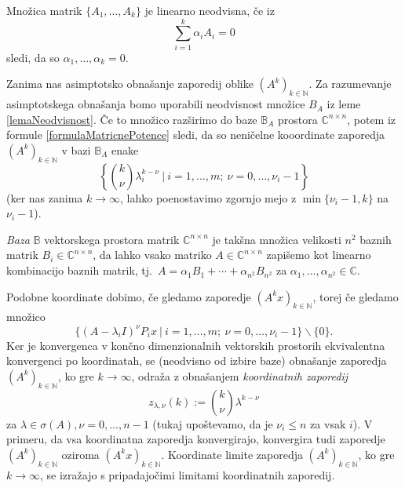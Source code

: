 \documentclass[mat1]{fmfdelo}
\newcommand{\N}{\mathbb N}
\newcommand{\C}{\mathbb C}
\begin{document}
\begin{opomba}
    Množica matrik $\{A_1, \ldots, A_k\}$ je linearno neodvisna, če iz
    \begin{equation*}
        \sum_{i=1}^k \alpha_i A_i = 0
    \end{equation*}
    sledi, da so $\alpha_1, \ldots, \alpha_k = 0$.
\end{opomba}
Zanima nas asimptotsko obnašanje zaporedij oblike $(A^k)_{k\in\N}$. Za razumevanje asimptotskega obnašanja bomo uporabili neodvisnost množice $B_A$ iz leme \ref{lemaNeodvisnost}. Če to množico razširimo do baze $\mathbb{B}_A$ prostora $\C^{n \times n}$, potem iz formule \eqref{formulaMatricnePotence} sledi, da so neničelne kooordinate zaporedja $(A^k)_{k\in\N}$ v bazi $\mathbb{B}_A$ enake
\begin{equation*}
    \left\{{k \choose \nu} \lambda_i^{k-\nu}\ |\ i = 1, \ldots, m;\ \nu = 0, \ldots, \nu_i-1\right\}
\end{equation*}
(ker nas zanima $k \rightarrow \infty$, lahko poenostavimo zgornjo mejo z $\min\{\nu_i-1, k\}$ na $\nu_i - 1$).
\begin{opomba}
    \emph{Baza} $\mathbb{B}$ vektorskega prostora matrik $\C^{n\times n}$ je takšna množica velikosti $n^2$ baznih matrik $B_i \in \C^{n\times n}$, da lahko vsako matriko $A \in \C^{n\times n}$ zapišemo kot linearno kombinacijo baznih matrik, tj.\ $A = \alpha_1 B_1 + \cdots + \alpha_{n^2} B_{n^2}$ za $\alpha_1, \ldots, \alpha_{n^2} \in \C$.
\end{opomba}
Podobne koordinate dobimo, če gledamo zaporedje $(A^k x)_{k\in\N}$, torej če gledamo množico
\begin{equation*}
    \{(A-\lambda_i I)^{\nu} P_i x\ |\ i = 1, \ldots, m;\ \nu = 0, \ldots, \nu_i - 1\} \backslash \{0\}.
\end{equation*}
Ker je konvergenca v končno dimenzionalnih vektorskih prostorih ekvivalentna konvergenci po koordinatah, se (neodvisno od izbire baze) obnašanje zaporedja $(A^k)_{k\in\N}$, ko gre $k \rightarrow \infty$, odraža z obnašanjem \emph{koordinatnih zaporedij}
\begin{equation*}
    z_{\lambda, \nu} (k) := {k \choose \nu} \lambda^{k - \nu}
\end{equation*}
za $\lambda \in \sigma(A), \nu = 0, \ldots, n-1$  (tukaj upoštevamo, da je $\nu_i \leq n$ za vsak $i$). V primeru, da vsa koordinatna zaporedja konvergirajo, konvergira tudi zaporedje $(A^k)_{k\in\N}$ oziroma $(A^k x)_{k\in\N}$. Koordinate limite zaporedja $(A^k)_{k\in\N}$, ko gre $k \rightarrow \infty$, se izražajo s pripadajočimi limitami koordinatnih zaporedij.
\end{document}

